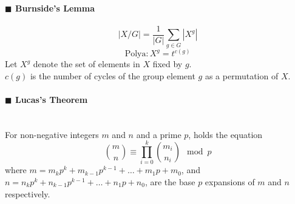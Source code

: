 \documentclass[10pt]{article}
\begin{document}
\paragraph{$\blacksquare$ Burnside's Lemma}
\noindent
\begin{displaymath}
|X/G|=\frac{1}{|G|}\sum_{g\in G}|X^g|
\end{displaymath}
\begin{displaymath}
\mathrm{Polya}: X^g=t^{c(g)}
\end{displaymath}
Let $X^g$ denote the set of elements in $X$ fixed by $g$. \\
$c(g)$ is the number of cycles of the group element $g$ as a permutation of $X$.
\paragraph{$\blacksquare$ Lucas's Theorem}
\noindent \\
For non-negative integers $m$ and $n$ and a prime $p$, holds the equation \\
\begin{displaymath}
\binom{m}{n} \equiv \prod_{i=0}^k \binom{m_i}{n_i} \mod p
\end{displaymath}
where $m=m_kp^k+m_{k-1}p^{k-1}+\ldots +m_1p+m_0$, and $n=n_kp^k+n_{k-1}p^{k-1}+\ldots +n_1p+n_0$, are the base $p$ expansions of $m$ and $n$ respectively.
\end{document}

